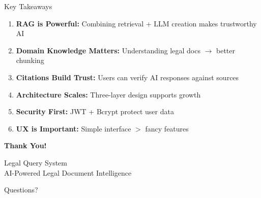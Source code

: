 \documentclass[11pt,aspectratio=16:9]{beamer}
\begin{document}
\begin{frame}{Key Takeaways}
    \begin{enumerate}
        \item \textbf{RAG is Powerful:} Combining retrieval + LLM creation makes trustworthy AI
        \item \textbf{Domain Knowledge Matters:} Understanding legal docs $\rightarrow$ better chunking
        \item \textbf{Citations Build Trust:} Users can verify AI responses against sources
        \item \textbf{Architecture Scales:} Three-layer design supports growth
        \item \textbf{Security First:} JWT + Bcrypt protect user data
        \item \textbf{UX is Important:} Simple interface $>$ fancy features
    \end{enumerate}
\end{frame}

\begin{frame}[plain]
    \begin{center}
        \Huge \textbf{Thank You!}
        
        \vspace{1cm}
        
        \Large Legal Query System \\
        \large AI-Powered Legal Document Intelligence
        
        \vspace{2cm}
        
        {\footnotesize Questions?}
    \end{center}
\end{frame}
\end{document}
